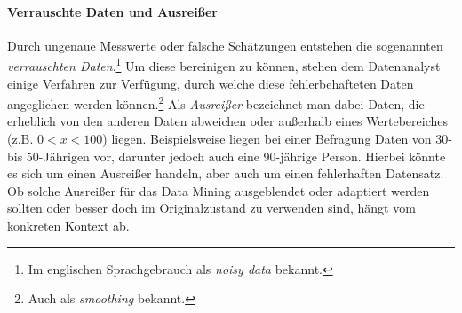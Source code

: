 \paragraph{Verrauschte Daten und Ausreißer}
\label{outlierchapter}
Durch ungenaue Messwerte oder falsche Schätzungen entstehen die sogenannten \textit{verrauschten Daten}.\footnote{Im englischen Sprachgebrauch als \textit{noisy data} bekannt.} Um diese bereinigen zu können, stehen dem Datenanalyst einige Verfahren zur Verfügung, durch welche diese fehlerbehafteten Daten angeglichen werden können.\footnote{Auch als \textit{smoothing} bekannt.} Als \textit{Ausreißer} bezeichnet man dabei Daten, die erheblich von den anderen Daten abweichen oder außerhalb eines Wertebereiches (z.B. $0<x<100$) liegen. Beispielsweise liegen bei einer Befragung Daten von 30- bis 50-Jährigen vor, darunter jedoch auch eine 90-jährige Person. Hierbei könnte es sich um einen Ausreißer handeln, aber auch um einen fehlerhaften Datensatz. \glqq Ob solche Ausreißer für das Data Mining ausgeblendet oder adaptiert werden sollten oder besser doch im Originalzustand zu verwenden sind, hängt vom konkreten Kontext ab.\grqq{}


